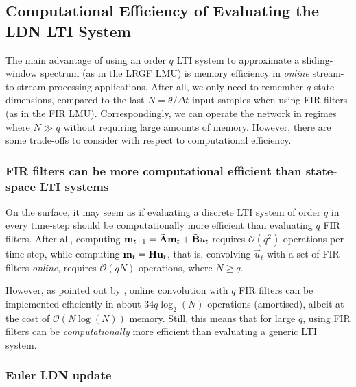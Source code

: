 \subsection{Computational Efficiency of Evaluating the LDN LTI System}
\label{sec:ldn_computational_efficiency}

The main advantage of using an order $q$ LTI system to approximate a sliding-window spectrum (as in the LRGF LMU) is memory efficiency in \emph{online} stream-to-stream processing applications.
After all, we only need to remember $q$ state dimensions, compared to the last $N = \theta / \Delta t$ input samples when using FIR filters (as in the FIR LMU).
Correspondingly, we can operate the network in regimes where $N \gg q$ without requiring large amounts of memory.
However, there are some trade-offs to consider with respect to computational efficiency.

\subsubsection{FIR filters can be more computational efficient than state-space LTI systems}
On the surface, it may seem as if evaluating a discrete LTI system of order $q$ in every time-step should be computationally more efficient than evaluating $q$ FIR filters.
After all, computing $\mathbf{m}_{t + 1} = \mathbf{\tilde A} \mathbf{m}_t + \mathbf{\tilde B} u_t$ requires $\mathcal{O}(q^2)$ operations per time-step, while computing $\mathbf{m}_t = \mathbf{H} \mathbf{u}_t$, that is, convolving $\vec u_t$ with a set of FIR filters \emph{online}, requires $\mathcal{O}(qN)$ operations, where $N \geq q$.

However, as pointed out by \citet{gardner1995efficient}, online convolution with $q$ FIR filters can be implemented efficiently in about $34 q \log_2(N)$ operations (amortised), albeit at the cost of $\mathcal{O}(N \log(N))$ memory.
Still, this means that for large $q$, using FIR filters can be \emph{computationally} more efficient than evaluating a generic LTI system.

\subsubsection{Euler LDN update}

